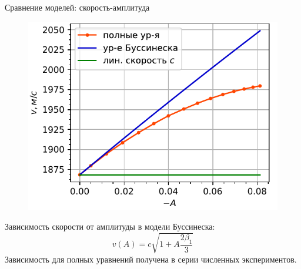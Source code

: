 \documentclass[usenames,dvipsnames]{beamer}
\DeclareMathOperator{\erf}{erf}
\newcommand{\lb}{\left (}
\newcommand{\rb}{\right )}
\newcommand{\pdiff}[2]{\frac{\partial #1}{\partial #2}}
\begin{document}
\begin{frame}{Сравнение моделей: скорость-амплитуда}
\begin{figure}
	\includegraphics[width=\linewidth]{figures/VelAmplColor}
\end{figure}
Зависимость скорости от амплитуды в модели Буссинеска:
\begin{equation}\nonumber
v(A) = c\sqrt{1 + A\frac{2\beta_1}{3}}
\end{equation}
Зависимость для полных уравнений получена в серии численных экспериментов.\\
\end{frame}
\end{document}
